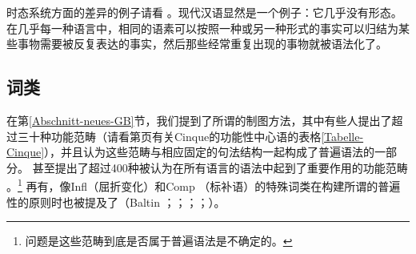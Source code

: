 时态系统方面的差异的例子请看 。现代汉语显然是一个例子：它几乎没有形态。在几乎每一种语言中，相同的语素可以按照一种或另一种形式的事实可以归结为某些事物需要被反复表达的事实，然后那些经常重复出现的事物就被语法化了。


\subsection{词类}
\label{Abschnitt-UG-Wortarten}

在第\ref{Abschnitt-neues-GB}节，我们提到了所谓的制图方法，其中有些人提出了超过三十种功能范畴（请看第\pageref{Tabelle-Cinque}页有关Cinque的功能性中心语的表格\ref{Tabelle-Cinque}），并且认为这些范畴与相应固定的句法结构一起构成了普遍语法的一部分。 \citet[, 57]{CR2010a}甚至提出了超过400种被认为在所有语言的语法中起到了重要作用的功能范畴
。\footnote{%
问题是这些范畴到底是否属于普遍语法是不确定的。
}
再有，像\mbox{Infl}（屈折变化）和Comp （标补语）的特殊词类在构建所谓的普遍性的原则时也被提及了（Baltin \citeyear[]{Baltin81a}；\citeyear{Baltin2006a}；\citealp{Rizzi82b}；\citealp[]{Chomsky86b}；\citealp[]{Hornstein2013a}）。


